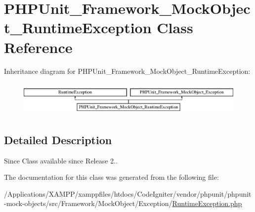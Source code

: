 \hypertarget{class_p_h_p_unit___framework___mock_object___runtime_exception}{}\section{P\+H\+P\+Unit\+\_\+\+Framework\+\_\+\+Mock\+Object\+\_\+\+Runtime\+Exception Class Reference}
\label{class_p_h_p_unit___framework___mock_object___runtime_exception}
Inheritance diagram for P\+H\+P\+Unit\+\_\+\+Framework\+\_\+\+Mock\+Object\+\_\+\+Runtime\+Exception\+:\begin{figure}[H]
\begin{center}
\leavevmode
\includegraphics[height=1.766562cm]{class_p_h_p_unit___framework___mock_object___runtime_exception}
\end{center}
\end{figure}


\subsection{Detailed Description}
\begin{DoxySince}{Since}
Class available since Release 2.. 
\end{DoxySince}


The documentation for this class was generated from the following file\+:\begin{DoxyCompactItemize}
\item 
/\+Applications/\+X\+A\+M\+P\+P/xamppfiles/htdocs/\+Code\+Igniter/vendor/phpunit/phpunit-\/mock-\/objects/src/\+Framework/\+Mock\+Object/\+Exception/\mbox{\hyperlink{phpunit_2phpunit-mock-objects_2src_2_framework_2_mock_object_2_exception_2_runtime_exception_8php}{Runtime\+Exception.\+php}}\end{DoxyCompactItemize}
